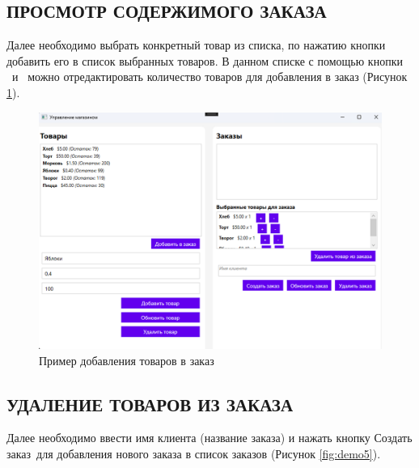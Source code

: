 \documentclass[12pt]{article}
\renewcommand{\texttt}[1]{{\small\ttfamily #1}}
\numberwithin{listing}{section}
\numberwithin{figure}{section}
\begin{document}
\pagebreak

\subsection{ПРОСМОТР СОДЕРЖИМОГО ЗАКАЗА}

Далее необходимо выбрать конкретный товар из списка, по нажатию кнопки добавить его в список выбранных товаров. В данном списке с помощью кнопки \guillemotleft\texttt{+}\guillemotright \ и \guillemotleft\texttt{-}\guillemotright \ можно отредактировать количество товаров для добавления в заказ (Рисунок \ref{fig:demo4}).


\begin{figure}[ht]
	\centering
	\includegraphics[width=1.0\textwidth]{fig/image 61.png}
	\caption{Пример добавления товаров в заказ} %
	\label{fig:demo4}
\end{figure}

\pagebreak

\subsection{УДАЛЕНИЕ ТОВАРОВ ИЗ ЗАКАЗА}

Далее необходимо ввести имя клиента (название заказа) и нажать кнопку \guillemotleft Создать заказ\guillemotright \ для добавления нового заказа в список заказов (Рисунок \ref{fig:demo5}).
\end{document}
